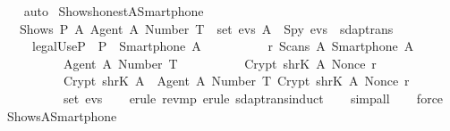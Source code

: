 \begin{isabellebody}
  \ \ \isamarkupfalse%
  \ {\isacharparenleft}auto{\isacharparenright}\isanewline
  \isamarkupfalse%
  \endisatagproof
  {\isafoldproof}%
  \isadelimproof
  \isanewline
  \endisadelimproof
  \isanewline
  \isamarkupfalse%
  \ Shows{\isacharunderscore}honest{\isacharunderscore}A{\isacharunderscore}Smartphone{\isacharunderscore}{}\ {\isacharcolon}\isanewline
  \ \ {\isachardoublequoteopen}{\isasymlbrakk}\ Shows\ P\ A\ {\isasymlbrace}Agent\ A{\isacharcomma}\ Number\ T{\isasymrbrace}\ {\isasymin}\ set\ evs{\isacharsemicolon}\ A\ {\isasymnoteq}\ Spy{\isacharsemicolon}\ evs\ {\isasymin}\ sdaptrans\ {\isasymrbrakk}\isanewline
  \ \ \ \ {\isasymLongrightarrow}\ {\isacharparenleft}legalUse{\isacharparenleft}P{\isacharparenright}{\isacharparenright}\ {\isasymand}\ P\ {\isacharequal}\ {\isacharparenleft}Smartphone\ A{\isacharparenright}\ {\isasymand}\isanewline
  \ \ \ \ \ \ \ \ {\isacharparenleft}{\isasymexists}\ r{\isachardot}\ Scans\ A\ {\isacharparenleft}Smartphone\ A{\isacharparenright}\ {\isasymlbrace}\isanewline
  \ \ \ \ \ \ \ \ \ \ {\isasymlbrace}Agent\ A{\isacharcomma}\ Number\ T{\isasymrbrace}{\isacharcomma}\isanewline
  \ \ \ \ \ \ \ \ \ \ Crypt\ {\isacharparenleft}shrK\ A{\isacharparenright}\ {\isacharparenleft}Nonce\ r{\isacharparenright}{\isacharcomma}\isanewline
  \ \ \ \ \ \ \ \ \ \ Crypt\ {\isacharparenleft}shrK\ A{\isacharparenright}\ {\isasymlbrace}\ {\isasymlbrace}Agent\ A{\isacharcomma}\ Number\ T{\isasymrbrace}{\isacharcomma}\ Crypt\ {\isacharparenleft}shrK\ A{\isacharparenright}\ {\isacharparenleft}Nonce\ r{\isacharparenright}\ {\isasymrbrace}\isanewline
  \ \ \ \ \ \ \ \ {\isasymrbrace}\ {\isasymin}\ set\ evs{\isacharparenright}{\isachardoublequoteclose}\isanewline
  \isadelimproof
  \isanewline
  \ \ %
  \endisadelimproof
  \isatagproof
  \isamarkupfalse%
  \ {\isacharparenleft}erule\ rev{\isacharunderscore}mp{\isacharcomma}\ erule\ sdaptrans{\isachardot}induct{\isacharparenright}\isanewline
  \ \ \isamarkupfalse%
  \ {\isacharparenleft}simp{\isacharunderscore}all{\isacharparenright}\isanewline
  \ \ \isamarkupfalse%
  \ {\isacharparenleft}force{\isacharplus}{\isacharparenright}\isanewline
  \isamarkupfalse%
  \endisatagproof
  {\isafoldproof}%
  \isadelimproof
  \isanewline
  \endisadelimproof
  \isanewline
  \isanewline
  \isamarkupfalse%
  \ Shows{\isacharunderscore}A{\isacharunderscore}Smartphone{\isacharunderscore}{}\ {\isacharcolon}\isanewline

\end{isabellebody}
